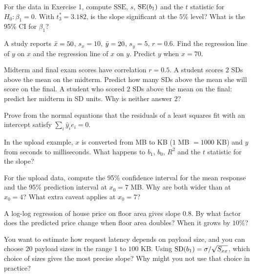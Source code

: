 \begin{exercise}
For the data in Exercise 1, compute $\mathrm{SSE}$, $s$, $\operatorname{SE}(b_1)$ and the
$t$ statistic for $H_0\colon\beta_1=0$. With $t^*_3 = 3.182$, is the slope
significant at the $5\%$ level? What is the 95\% CI for $\beta_1$?
\end{exercise}

\begin{exercise}
A study reports $\bar{x} = 50$, $s_x = 10$, $\bar{y} = 20$, $s_y = 5$, $r = 0.6$.
Find the regression line of $y$ on $x$ and the regression line of $x$ on $y$.
Predict $y$ when $x = 70$.
\end{exercise}

\begin{exercise}
Midterm and final exam scores have correlation $r=0.5$. A student scores
$2$ SDs above the mean on the midterm. Predict how many SDs above the mean she
will score on the final. A student who scored $2$ SDs above the mean on the
final: predict her midterm in SD units. Why is neither answer $2$?
\end{exercise}

\begin{exercise}
Prove from the normal equations that the residuals of a least squares fit with
an intercept satisfy $\sum_i \hat y_i e_i = 0$.
\end{exercise}

\begin{exercise}
In the upload example, $x$ is converted from MB to KB ($1$ MB $=1000$ KB) and
$y$ from seconds to milliseconds. What happens to $b_1$, $b_0$, $R^2$ and the
$t$ statistic for the slope?
\end{exercise}

\begin{exercise}
For the upload data, compute the 95\% confidence interval for the mean response
and the 95\% prediction interval at $x_0 = 7$ MB. Why are both wider than at
$x_0 = 4$? What extra caveat applies at $x_0=7$?
\end{exercise}

\begin{exercise}
A log-log regression of house price on floor area gives slope $0.8$. By what
factor does the predicted price change when floor area doubles? When it grows
by $10\%$?
\end{exercise}

\begin{exercise}
You want to estimate how request latency depends on payload size, and you can
choose $20$ payload sizes in the range $1$ to $100$ KB. Using
$\operatorname{SD}(b_1) = \sigma/\sqrt{S_{xx}}$, which choice of sizes gives the most precise
slope? Why might you not use that choice in practice?
\end{exercise}


